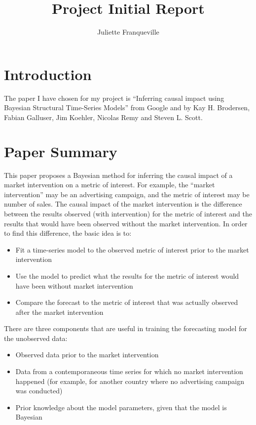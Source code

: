 \documentclass[12pt]{article}
\begin{document}
 
\title{Project Initial Report}
\author{Juliette Franqueville\\
}
\maketitle
\newpage
\section{Introduction}
The paper I have chosen for my project is ``Inferring causal impact using Bayesian Structural Time-Series Models'' from Google and by  Kay H. Brodersen, Fabian Galluser, Jim Koehler, Nicolas Remy and Steven L. Scott.

\section{Paper Summary}
This paper proposes a Bayesian method for inferring  the causal impact of a market intervention on a metric of interest. For example, the ``market intervention'' may be an advertising campaign, and the metric of interest may be number of sales. The causal impact of the market intervention is the difference between the results observed (with intervention) for the metric of interest and the results that would have been observed without the market intervention. In order to find this difference, the basic idea is to:\\
\begin{itemize}
    \item Fit a time-series model to the observed metric of interest prior to the market intervention
    \item Use the model to predict what the results for the metric of interest would have been without market intervention
    \item Compare the forecast to the metric of interest that was actually observed after the market intervention\\
    \end{itemize}  

There are three components that are useful in training the forecasting model for the unobserved data:\\

\begin{itemize}
    \item Observed data prior to the market intervention
    \item Data from a contemporaneous time series for which no market intervention happened  (for example, for another country where no advertising campaign was conducted) 
    \item Prior knowledge about the model parameters, given that the model is Bayesian\\
    \end{itemize}  
\end{document}

